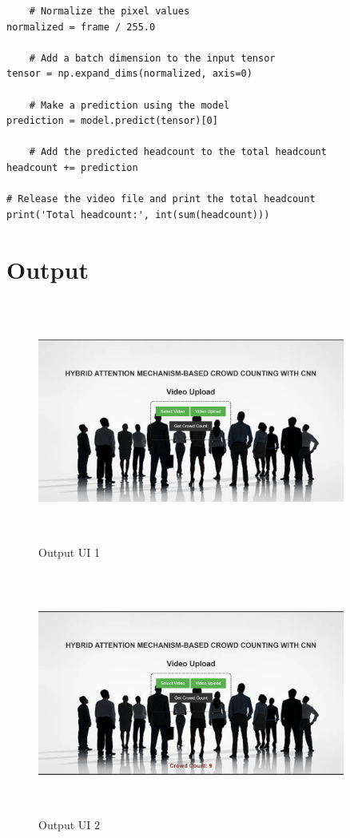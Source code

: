 \documentclass[12pt]{report}
\begin{document}
\begin{lstlisting}
    # Normalize the pixel values
normalized = frame / 255.0

    # Add a batch dimension to the input tensor
tensor = np.expand_dims(normalized, axis=0)
    
    # Make a prediction using the model
prediction = model.predict(tensor)[0]
    
    # Add the predicted headcount to the total headcount
headcount += prediction
    
# Release the video file and print the total headcount
print('Total headcount:', int(sum(headcount)))

\end{lstlisting}


\chapter{Output}

\begin{figure}[htbp]
  \centering
  \includegraphics [width=0.9\textwidth, height=8cm]{1.png}
  \caption{Output UI 1}
  \label{fig:image}
\end{figure}

\begin{figure}[htbp]
  \centering
  \includegraphics [width=0.9\textwidth, height=8cm]{2.png}
  \caption{Output UI 2}
  \label{fig:image}
\end{figure}
\end{document}
